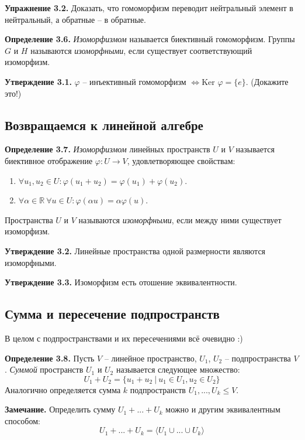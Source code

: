 \documentclass[a4paper, 12pt]{article}
\begin{document}
\begin{spacing}{1.5}
\textbf{Упражнение 3.2.} Доказать, что гомоморфизм переводит нейтральный элемент в нейтральный, а обратные -- в обратные. 

\textbf{Определение 3.6.} \textit{Изоморфизмом} называется биективный гомоморфизм. Группы $G$ и $H$ называются \textit{изоморфными}, если существует соответствующий изоморфизм.

\textbf{Утверждение 3.1.} $\varphi$ -- инъективный гомоморфизм $\Leftrightarrow \text{Ker } \varphi = \{e\}$. (Докажите это!)


\subsection*{Возвращаемся к линейной алгебре}

\textbf{Определение 3.7.} \textit{Изоморфизмом} линейных пространств $U$ и $V$ называется биективное отображение $\varphi: U \rightarrow V$, удовлетворяющее свойствам:
\begin{enumerate}[noitemsep]
    \item $\forall u_1, u_2 \in U: \varphi(u_1 + u_2) = \varphi(u_1) + \varphi(u_2)$.
    \item $\forall \alpha \in \mathbb{R} \ \forall u \in U: \varphi(\alpha u) = \alpha \varphi(u)$.
\end{enumerate}
Пространства $U$ и $V$ называются \textit{изоморфными}, если между ними существует изоморфизм.

\textbf{Утверждение 3.2.} Линейные пространства одной размерности являются изоморфными.

\textbf{Утверждение 3.3.} Изоморфизм есть отошение эквивалентности.


\subsection*{Сумма и пересечение подпространств}

В целом с подпространствами и их пересечениями всё очевидно :)

\textbf{Определение 3.8.} Пусть $V$ -- линейное пространство, $U_1$, $U_2$ -- подпространства $V$. \textit{Суммой} пространств $U_1$ и $U_2$ называется следующее множество:
$$U_1 + U_2 = \{ u_1 + u_2 \ | \ u_1 \in U_1, u_2 \in U_2 \}$$
Аналогично определяется сумма $k$ подпространств  $U_1, ..., U_k \leq V$.

\textbf{Замечание.} Определить сумму $U_1 + ... + U_k$ можно и другим эквивалентным способом: 
$$U_1 + ... + U_k = \langle U_1 \cup ... \cup U_k \rangle$$


\end{spacing}
\end{document}
